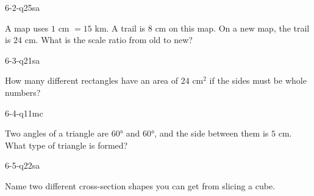 \begin{practiceQuestion}{6-2-q25}{sa}
\begin{questionText}
A map uses $1$ cm $= 15$ km. A trail is $8$ cm on this map. On a new map, the trail is $24$ cm. What is the scale ratio from old to new?
\end{questionText}
\end{practiceQuestion}

\begin{practiceQuestion}{6-3-q21}{sa}
\begin{questionText}
How many different rectangles have an area of $24$ cm$^2$ if the sides must be whole numbers?
\end{questionText}
\end{practiceQuestion}

\begin{practiceQuestion}{6-4-q11}{mc}
\begin{questionText}
Two angles of a triangle are $60°$ and $60°$, and the side between them is $5$ cm. What type of triangle is formed?
\end{questionText}
\end{practiceQuestion}

\begin{practiceQuestion}{6-5-q22}{sa}
\begin{questionText}
Name two different cross-section shapes you can get from slicing a cube.
\end{questionText}
\end{practiceQuestion}

